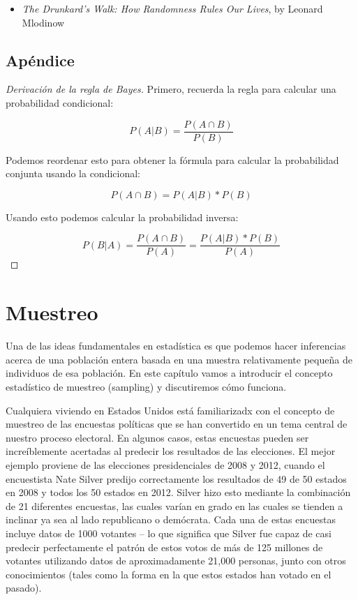 \documentclass[
  12pt,
]{book}
\providecommand{\tightlist}{%
  \setlength{\itemsep}{0pt}\setlength{\parskip}{0pt}}
\theoremstyle{definition}
\theoremstyle{definition}
\theoremstyle{definition}
\theoremstyle{remark}
\begin{document}
\begin{itemize}
\tightlist
\item
  \emph{The Drunkard's Walk: How Randomness Rules Our Lives}, by Leonard Mlodinow
\end{itemize}

\hypertarget{apuxe9ndice}{%
\section{Apéndice}\label{apuxe9ndice}}

\begin{proof}[Derivación de la regla de Bayes]
{}
Primero, recuerda la regla para calcular una probabilidad condicional:

\[
P(A|B) = \frac{P(A \cap B)}{P(B)}
\]

Podemos reordenar esto para obtener la fórmula para calcular la probabilidad conjunta usando la condicional:

\[
P(A \cap B) = P(A|B) * P(B)
\]

Usando esto podemos calcular la probabilidad inversa:

\[
P(B|A) = \frac{P(A \cap B)}{P(A)} =   \frac{P(A|B)*P(B)}{P(A)}
\]
\end{proof}

\hypertarget{sampling}{%
\chapter{Muestreo}\label{sampling}}

Una de las ideas fundamentales en estadística es que podemos hacer inferencias acerca de una población entera basada en una muestra relativamente pequeña de individuos de esa población. En este capítulo vamos a introducir el concepto estadístico de muestreo (sampling) y discutiremos cómo funciona.

Cualquiera viviendo en Estados Unidos está familiarizadx con el concepto de muestreo de las encuestas políticas que se han convertido en un tema central de nuestro proceso electoral. En algunos casos, estas encuestas pueden ser increíblemente acertadas al predecir los resultados de las elecciones. El mejor ejemplo proviene de las elecciones presidenciales de 2008 y 2012, cuando el encuestista Nate Silver predijo correctamente los resultados de 49 de 50 estados en 2008 y todos los 50 estados en 2012. Silver hizo esto mediante la combinación de 21 diferentes encuestas, las cuales varían en grado en las cuales se tienden a inclinar ya sea al lado republicano o demócrata. Cada una de estas encuestas incluye datos de 1000 votantes -- lo que significa que Silver fue capaz de casi predecir perfectamente el patrón de estos votos de más de 125 millones de votantes utilizando datos de aproximadamente 21,000 personas, junto con otros conocimientos (tales como la forma en la que estos estados han votado en el pasado).
\end{document}
